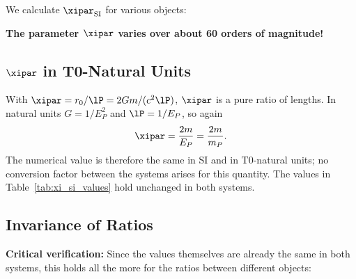 	We calculate $\xipar_{\text{SI}}$ for various objects:
	
	\begin{table}[htbp]
		\centering
		\caption{$\xipar$ values for different objects in SI units}
		\label{tab:xi_si_values}
	\end{table}
	
	\textbf{The parameter $\xipar$ varies over about 60 orders of magnitude!}
	
	\subsection{$\xipar$ in T0-Natural Units}
	\label{subsec:xi_transformation}
	
	With $\xipar = r_0/\lP = 2Gm/(c^2\lP)$, $\xipar$ is a pure ratio of lengths. In natural units $G = 1/E_P^2$ and $\lP = 1/E_P$, so again
	\begin{equation}
		\xipar = \frac{2m}{E_P} = \frac{2m}{m_P}.
	\end{equation}
	The numerical value is therefore the same in SI and in T0-natural units; no conversion factor between the systems arises for this quantity. The values in Table~\ref{tab:xi_si_values} hold unchanged in both systems.
	
	\subsection{Invariance of Ratios}
	\label{subsec:xi_ratio_invariance}
	
	\textbf{Critical verification:} Since the values themselves are already the same in both systems, this holds all the more for the ratios between different objects:
	
